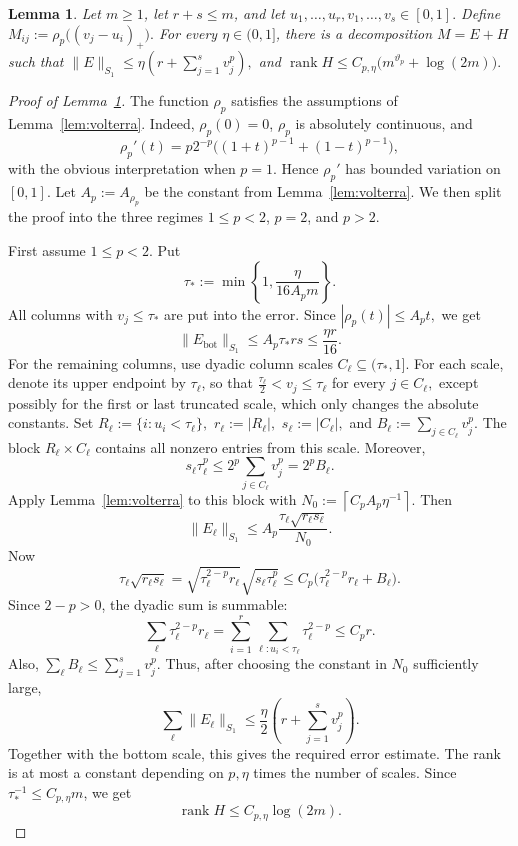 \documentclass[11pt]{article}
\newtheorem{lemma}[theorem]{Lemma}
\theoremstyle{definition}
\begin{document}
\begin{lemma}\label{lem:rectangular-corner-rank}
Let \(m\ge1\), let \(r+s\le m\), and let
\(
u_1,\dots,u_r,v_1,\dots,v_s\in[0,1].
\)
Define
\(
M_{ij}:=\rho_p\bigl((v_j-u_i)_+\bigr).
\)
For every \(\eta\in(0,1]\), there is a decomposition
\(
M=E+H
\)
such that
\(
\|E\|_{S_1}
\le
\eta\left(r+\sum_{j=1}^s v_j^p\right),
\)
and
\(
\operatorname{rank}H
\le
C_{p,\eta}\bigl(m^{\vartheta_p}+\log(2m)\bigr).
\)
\end{lemma}

\begin{proof}[Proof of Lemma~\ref{lem:rectangular-corner-rank}]
The function \(\rho_p\) satisfies the assumptions of Lemma~\ref{lem:volterra}.
Indeed, \(\rho_p(0)=0\), \(\rho_p\) is absolutely continuous, and
\[
\rho_p'(t)
=
p2^{-p}\bigl((1+t)^{p-1}+(1-t)^{p-1}\bigr),
\]
with the obvious interpretation when \(p=1\). Hence \(\rho_p'\) has bounded
variation on \([0,1]\). Let \(A_p:=A_{\rho_p}\) be the constant from
Lemma~\ref{lem:volterra}. We then split the proof into the three regimes \(1\le p<2\), \(p=2\), and \(p>2\).

First assume \(1\le p<2\). Put
\[
\tau_*:=\min\left\{1,\frac{\eta}{16A_pm}\right\}.
\]
All columns with \(v_j\le\tau_*\) are put into the error. Since
\(
|\rho_p(t)|\le A_pt,
\)
we get
\[
\|E_{\mathrm{bot}}\|_{S_1}
\le
A_p\tau_*rs
\le
\frac{\eta r}{16}.
\]
For the remaining columns, use dyadic column scales \(C_\ell\subseteq(\tau_*,1]\). For each scale, denote its upper endpoint by \(\tau_\ell\), so that \( \frac{\tau_\ell}{2}<v_j\le \tau_\ell\) for every \(j\in C_\ell, \) except possibly for the first or last truncated scale, which only changes the absolute constants. Set \(R_\ell:=\{i:u_i<\tau_\ell\},\) \(r_\ell:=|R_\ell|,\) \(s_\ell:=|C_\ell|,\) and \( B_\ell:=\sum_{j\in C_\ell}v_j^p.\) The block \(R_\ell\times C_\ell\) contains all nonzero entries from this scale. Moreover, \[ s_\ell\tau_\ell^p \le 2^p\sum_{j\in C_\ell}v_j^p = 2^pB_\ell. \]
Apply Lemma~\ref{lem:volterra} to this block with
\(
N_0:=\left\lceil C_pA_p\eta^{-1}\right\rceil.
\)
Then
\[
\|E_\ell\|_{S_1}
\le
A_p\frac{\tau_\ell\sqrt{r_\ell s_\ell}}{N_0}.
\]
Now
\[
\tau_\ell\sqrt{r_\ell s_\ell}
=
\sqrt{\tau_\ell^{2-p}r_\ell}\sqrt{s_\ell\tau_\ell^p}
\le
C_p\bigl(\tau_\ell^{2-p}r_\ell+B_\ell\bigr).
\]
Since \(2-p>0\), the dyadic sum is summable:
\[
\sum_\ell \tau_\ell^{2-p}r_\ell
=
\sum_{i=1}^r\sum_{\ell:u_i<\tau_\ell}\tau_\ell^{2-p}
\le
C_pr.
\]
Also,
\(
\sum_\ell B_\ell\le\sum_{j=1}^s v_j^p.
\)
Thus, after choosing the constant in \(N_0\) sufficiently large,
\[
\sum_\ell\|E_\ell\|_{S_1}
\le
\frac{\eta}{2}\left(r+\sum_{j=1}^s v_j^p\right).
\]
Together with the bottom scale, this gives the required error estimate. The rank
is at most a constant depending on \(p,\eta\) times the number of scales. Since
\(\tau_*^{-1}\le C_{p,\eta}m\), we get
\[
\operatorname{rank}H\le C_{p,\eta}\log(2m).
\]


\end{proof}
\end{document}
